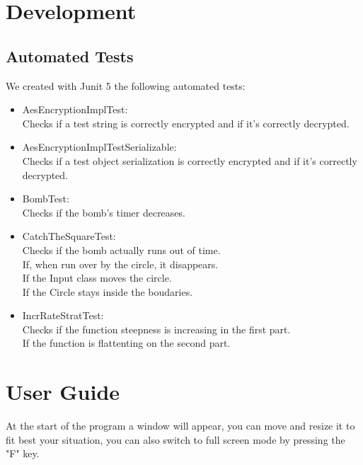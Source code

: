 \documentclass[a4paper,12pt]{report}
\begin{document}
\chapter{Development}
\section{Automated Tests}
We created with Junit 5 the following automated tests:
\begin{itemize}
	\item AesEncryptionImplTest:\\
	      Checks if a test string is correctly encrypted and if it's correctly decrypted.
	\item AesEncryptionImplTestSerializable:\\
	      Checks if a test object serialization is correctly encrypted and if it's correctly decrypted.
	\item BombTest:\\
	      Checks if the bomb's timer decreases.
	\item CatchTheSquareTest:\\
	      Checks if the bomb actually runs out of time.\\If, when run over by the circle, it disappears.\\ If the Input class moves the circle. \\ If the Circle stays inside the boudaries.
	\item IncrRateStratTest:\\
	      Checks if the function steepness is increasing in the first part.\\ If the function is flattenting on the second part.
\end{itemize}
\appendix
\chapter{User Guide}
At the start of the program a window will appear, you can move and resize it to fit best your situation, you can also {\color{red}switch to full screen mode by pressing the "F" key}.
\end{document}

